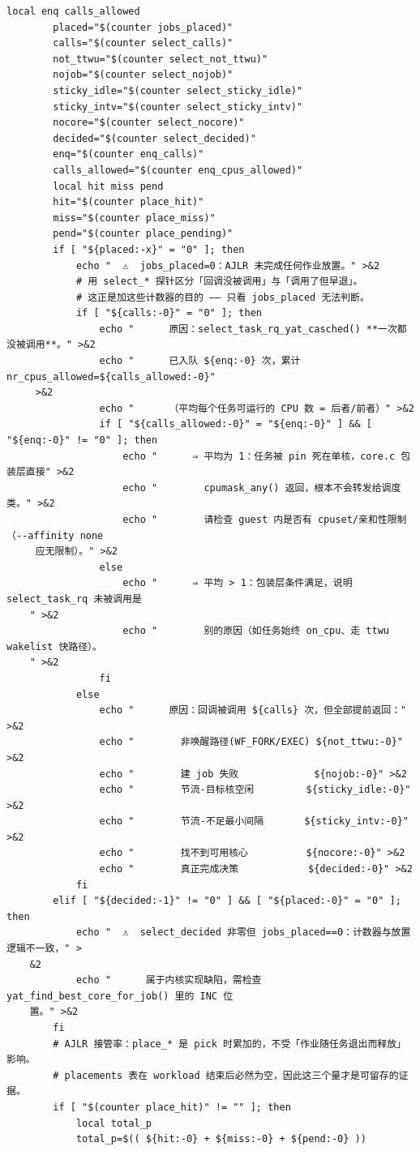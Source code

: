 \documentclass[10pt,a4paper]{article}
\newenvironment{yatpage}{\vspace*{0pt}}{\par}
\begin{document}
\newpage
\begin{yatpage}
\begin{Verbatim}[fontsize=\fontsize{8.2}{9.8}\selectfont]
        local enq calls_allowed
        placed="$(counter jobs_placed)"
        calls="$(counter select_calls)"
        not_ttwu="$(counter select_not_ttwu)"
        nojob="$(counter select_nojob)"
        sticky_idle="$(counter select_sticky_idle)"
        sticky_intv="$(counter select_sticky_intv)"
        nocore="$(counter select_nocore)"
        decided="$(counter select_decided)"
        enq="$(counter enq_calls)"
        calls_allowed="$(counter enq_cpus_allowed)"
        local hit miss pend
        hit="$(counter place_hit)"
        miss="$(counter place_miss)"
        pend="$(counter place_pending)"
        if [ "${placed:-x}" = "0" ]; then
            echo "  ⚠️  jobs_placed=0：AJLR 未完成任何作业放置。" >&2
            # 用 select_* 探针区分「回调没被调用」与「调用了但早退」。
            # 这正是加这些计数器的目的 —— 只看 jobs_placed 无法判断。
            if [ "${calls:-0}" = "0" ]; then
                echo "      原因：select_task_rq_yat_casched() **一次都没被调用**。" >&2
                echo "      已入队 ${enq:-0} 次，累计 nr_cpus_allowed=${calls_allowed:-0}"
     >&2
                echo "      （平均每个任务可运行的 CPU 数 = 后者/前者）" >&2
                if [ "${calls_allowed:-0}" = "${enq:-0}" ] && [ "${enq:-0}" != "0" ]; then
                    echo "      ⇒ 平均为 1：任务被 pin 死在单核，core.c 包装层直接" >&2
                    echo "        cpumask_any() 返回，根本不会转发给调度类。" >&2
                    echo "        请检查 guest 内是否有 cpuset/亲和性限制（--affinity none
     应无限制）。" >&2
                else
                    echo "      ⇒ 平均 > 1：包装层条件满足，说明 select_task_rq 未被调用是
    " >&2
                    echo "        别的原因（如任务始终 on_cpu、走 ttwu wakelist 快路径）。
    " >&2
                fi
            else
                echo "      原因：回调被调用 ${calls} 次，但全部提前返回：" >&2
                echo "        非唤醒路径(WF_FORK/EXEC) ${not_ttwu:-0}" >&2
                echo "        建 job 失败             ${nojob:-0}" >&2
                echo "        节流-目标核空闲         ${sticky_idle:-0}" >&2
                echo "        节流-不足最小间隔       ${sticky_intv:-0}" >&2
                echo "        找不到可用核心          ${nocore:-0}" >&2
                echo "        真正完成决策            ${decided:-0}" >&2
            fi
        elif [ "${decided:-1}" != "0" ] && [ "${placed:-0}" = "0" ]; then
            echo "  ⚠️  select_decided 非零但 jobs_placed==0：计数器与放置逻辑不一致，" >
    &2
            echo "      属于内核实现缺陷，需检查 yat_find_best_core_for_job() 里的 INC 位
    置。" >&2
        fi
        # AJLR 接管率：place_* 是 pick 时累加的，不受「作业随任务退出而释放」影响。
        # placements 表在 workload 结束后必然为空，因此这三个量才是可留存的证据。
        if [ "$(counter place_hit)" != "" ]; then
            local total_p
            total_p=$(( ${hit:-0} + ${miss:-0} + ${pend:-0} ))
\end{Verbatim}
\end{yatpage}
\end{document}
